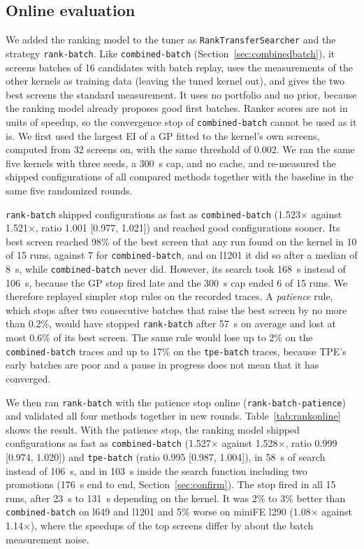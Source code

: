 \documentclass[10pt]{article}
\newcommand{\x}{\ensuremath{\times}}
\newcommand{\code}[1]{\texttt{#1}}
\begin{document}
\subsection{Online evaluation}
We added the ranking model to the tuner as \code{RankTransferSearcher} and
the strategy \code{rank-batch}. Like \code{combined-batch}
(Section~\ref{sec:combinedbatch}), it screens batches of 16 candidates with
batch replay, uses the measurements of the other kernels as training data
(leaving the tuned kernel out), and gives the two best screens the standard
measurement. It uses no portfolio and no prior, because the ranking model
already proposes good first batches. Ranker scores are not in units of
speedup, so the convergence stop of \code{combined-batch} cannot be used as
it is. We first used the largest EI of a GP fitted to the kernel's own screens,
computed from 32 screens on, with the same threshold of 0.002. We ran the
same five kernels with three seeds, a 300~s cap, and no cache, and re-measured
the shipped configurations of all compared methods together with the baseline
in the same five randomized rounds.

\code{rank-batch} shipped configurations as fast as \code{combined-batch}
(1.523\x{} against 1.521\x{}, ratio 1.001 [0.977, 1.021]) and reached good
configurations sooner. Its best screen reached 98\% of the best screen that
any run found on the kernel in 10 of 15 runs, against 7 for
\code{combined-batch}, and on l1201 it did so after a median of 8~s, while
\code{combined-batch} never did. However, its search took 168~s instead of
106~s, because the GP stop fired late and the 300~s cap ended 6 of 15 runs.
We therefore replayed simpler stop rules on the recorded traces. A
\emph{patience} rule, which stops after two consecutive batches that raise the
best screen by no more than 0.2\%, would have stopped \code{rank-batch} after
57~s on average and lost at most 0.6\% of its best screen. The same rule
would lose up to 2\% on the \code{combined-batch} traces and up to 17\% on the
\code{tpe-batch} traces, because TPE's early batches are poor and a pause in
progress does not mean that it has converged.

We then ran \code{rank-batch} with the patience stop online
(\code{rank-batch-patience}) and validated all four methods together in new
rounds. Table~\ref{tab:rankonline} shows the result. With the patience stop,
the ranking model shipped configurations as fast as \code{combined-batch}
(1.527\x{} against 1.528\x{}, ratio 0.999 [0.974, 1.020]) and
\code{tpe-batch} (ratio 0.995 [0.987, 1.004]), in 58~s of search instead of
106~s, and in 103~s inside the search function including two promotions
(176~s end to end, Section~\ref{sec:confirm}). The stop fired in all 15
runs, after 23~s to 131~s depending on the kernel. It was 2\% to 3\% better
than \code{combined-batch} on l649 and l1201 and 5\% worse on miniFE l290
(1.08\x{} against 1.14\x{}), where the speedups of the top screens differ by
about the batch measurement noise.
\end{document}
